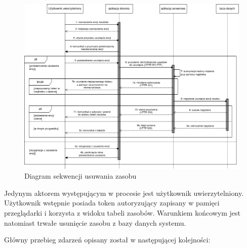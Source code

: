 \begin{figure}[!htbp] 
    \centering
    \includegraphics[width=\textwidth]{img/chapter4/open-osp.uml-diagrams-sequence.delete-resource.png}
    \caption{Diagram sekwencji usuwania zasobu}
    \label{fig:uml.sequence.delete-resource}
\end{figure}

Jedynym aktorem występującym w procesie jest użytkownik uwierzytelniony. Użytkownik wstępnie posiada token autoryzujący zapisany w pamięci przeglądarki i korzysta z widoku tabeli zasobów. Warunkiem końcowym jest natomiast trwałe usunięcie zasobu z bazy danych systemu.

Główny przebieg zdarzeń opisany został w następującej kolejności:

